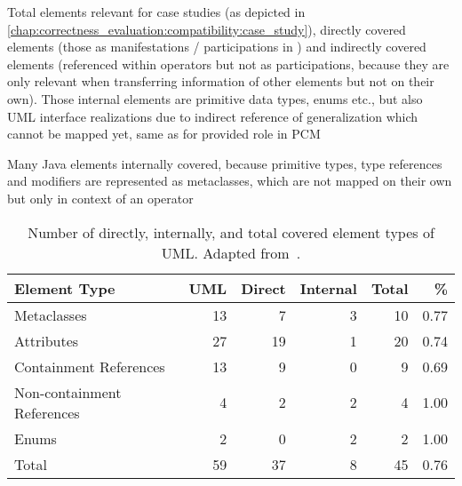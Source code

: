 Total elements relevant for case studies (as depicted in \autoref{chap:correctness_evaluation:compatibility:case_study}), directly covered elements (those as manifestations / participations in \commonalities) and indirectly covered elements (referenced within operators but not as participations, because they are only relevant when transferring information of other elements but not on their own).
Those internal elements are primitive data types, enums etc., but also UML interface realizations due to indirect reference of generalization which cannot be mapped yet, same as for provided role in PCM

Many Java elements internally covered, because primitive types, type references and modifiers are represented as metaclasses, which are not mapped on their own but only in context of an operator

\begin{table}[htb]
	\centering
		\begin{tabular}{lrrrrr}
			\toprule
			\multicolumn{1}{l}{\bfseries Element Type} & \multicolumn{1}{r}{\bfseries UML} & \multicolumn{1}{r}{\bfseries Direct} & \multicolumn{1}{r}{\bfseries Internal} & \multicolumn{1}{r}{\bfseries Total} & \multicolumn{1}{r}{\bfseries \%}\\
			\midrule
			Metaclasses 				& 13	& 7		& 3	& 10	& 0.77	\\
			Attributes 					& 27	& 19	& 1	& 20	& 0.74	\\
			Containment References 		& 13	& 9		& 0	& 9		& 0.69	\\
			Non-containment References 	& 4		& 2		& 2	& 4		& 1.00	\\
			Enums 						& 2		& 0		& 2	& 2		& 1.00	\\
			\midrule
			Total 						& 59	& 37	& 8	& 45	& 0.76	\\
			\bottomrule
		\end{tabular}
	\caption{Number of directly, internally, and total covered element types of UML. Adapted from~\cite[Table 10.4]{hennig2020ma}.}
	\label{tab:commonalities_evaluation:coverage_uml}
\end{table}


